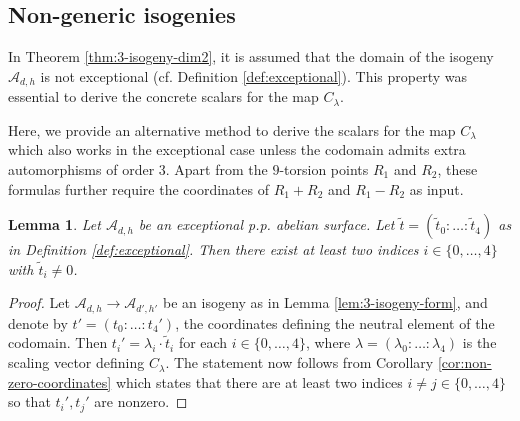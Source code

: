 \documentclass[11pt]{amsart}
\newtheorem{lemma}[theorem]{Lemma}
\theoremstyle{definition}
\newcommand{\A}{\mathcal{A}}
\begin{document}
\subsection{Non-generic isogenies}\label{subsec:nongeneric}

In Theorem \ref{thm:3-isogeny-dim2}, it is assumed that the domain of the isogeny $\A_{d,h}$ is not exceptional (cf. Definition \ref{def:exceptional}). This property was essential to derive  the concrete scalars for the map $C_\lambda$. 

Here, we provide an alternative method to derive the scalars for the map $C_{\lambda}$ which also works in the exceptional case unless the codomain admits extra  automorphisms of order $3$. Apart from the $9$-torsion points $R_1$ and $R_2$, these formulas further require the coordinates of $R_1 + R_2$ and $R_1 - R_2$ as input.


\begin{lemma} \label{lem:exceptional-points}
    Let $\A_{d,h}$ be an exceptional p.p. abelian surface. Let $\tilde{t}=(\tilde t_0: \dots: \tilde t_4) $ as in  Definition \ref{def:exceptional}. Then there exist at least two indices $i \in \{0, \dots, 4\}$  with $\tilde t_i \neq 0$.
\end{lemma}

\begin{proof}
	Let $\A_{d,h} \to \A_{d',h'}$ be an isogeny as in Lemma \ref{lem:3-isogeny-form}, and denote by $t' = (t_0 :\dots :t_4')$, the coordinates defining the neutral element of the codomain. Then $t_i' = \lambda_i \cdot \tilde{t}_i$ for each $i \in \{0, \dots, 4\}$, where $\lambda = (\lambda_0: \dots :\lambda_4)$ is the scaling vector defining $C_\lambda$. The statement now follows from Corollary \ref{cor:non-zero-coordinates} which states that there are at least two indices $i \neq j \in \{0,\dots, 4\}$ so that $t_i', t_j'$ are nonzero.
\end{proof}
\end{document}
